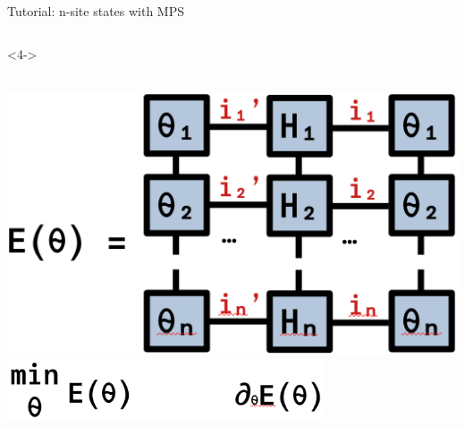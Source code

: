 \begin{frame}[fragile]{Tutorial: n-site states with MPS}
\begin{columns}
\begin{column}{4.5cm}
\begin{onlyenv}<4->
\vspace*{0.0cm}
~\\
~\\
\begin{center}
\includegraphics[width=1.0\textwidth]{
  slides/assets/thetan_H_thetan.png
} \\
\includegraphics[width=0.7\textwidth]{
  slides/assets/min_grad_E_theta.png
}
\end{center}
\vspace*{0.0cm}
\end{onlyenv}

\end{column}

\end{columns}

\end{frame}
